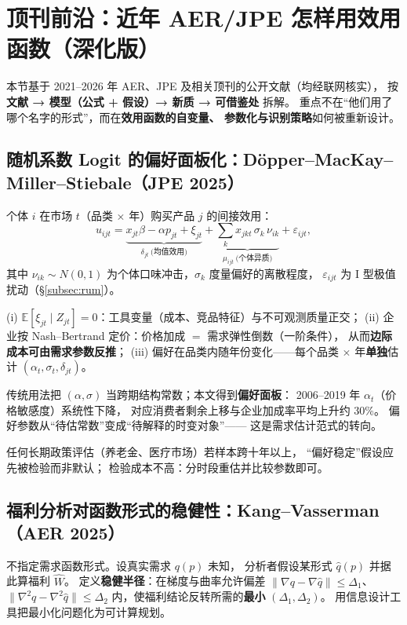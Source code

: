 \section{顶刊前沿：近年 AER/JPE 怎样用效用函数（深化版）}

本节基于 2021--2026 年 AER、JPE 及相关顶刊的公开文献（均经联网核实），
按 \textbf{文献 → 模型（公式 + 假设）→ 新质 → 可借鉴处} 拆解。
重点不在“他们用了哪个名字的形式”，而在\textbf{效用函数的自变量、
参数化与识别策略}如何被重新设计。

\subsection{随机系数 Logit 的偏好面板化：D\"opper--MacKay--Miller--Stiebale（JPE 2025）}\label{subsec:jpe-markups}

个体 $i$ 在市场 $t$（品类 $\times$ 年）购买产品 $j$ 的间接效用：
\[
u_{ijt}=\underbrace{x_{jt}\beta-\alpha p_{jt}+\xi_{jt}}_{\delta_{jt}\ \text{(均值效用)}}
+\underbrace{\sum_k x_{jkt}\,\sigma_k\,\nu_{ik}}_{\mu_{ijt}\ \text{(个体异质)}}
+\varepsilon_{ijt},
\]
其中 $\nu_{ik}\sim N(0,1)$ 为个体口味冲击，$\sigma_k$ 度量偏好的离散程度，
$\varepsilon_{ijt}$ 为 I 型极值扰动（§\ref{subsec:rum}）。

(i) $\mathbb{E}[\xi_{jt}\mid Z_{jt}]=0$：工具变量（成本、竞品特征）与不可观测质量正交；
(ii) 企业按 Nash--Bertrand 定价：价格加成 $=$ 需求弹性倒数（一阶条件），
从而\textbf{边际成本可由需求参数反推}；
(iii) 偏好在品类内随年份变化——每个品类 $\times$ 年\textbf{单独}估计
$(\alpha_t,\sigma_t,\delta_{jt})$。

传统用法把 $(\alpha,\sigma)$ 当跨期结构常数；本文得到\textbf{偏好面板}：
2006--2019 年 $\alpha_t$（价格敏感度）系统性下降，
对应消费者剩余上移与企业加成率平均上升约 30\%。
偏好参数从“待估常数”变成“待解释的时变对象”——
这是需求估计范式的转向。

任何长期政策评估（养老金、医疗市场）若样本跨十年以上，
“偏好稳定”假设应先被检验而非默认；
检验成本不高：分时段重估并比较参数即可。

\subsection{福利分析对函数形式的稳健性：Kang--Vasserman（AER 2025）}

不指定需求函数形式。设真实需求 $q(p)$ 未知，
分析者假设某形式 $\hat q(p)$ 并据此算福利 $\hat W$。
定义\textbf{稳健半径}：在梯度与曲率允许偏差
$\|\nabla q-\nabla\hat q\|\le\Delta_1$、$\|\nabla^2 q-\nabla^2\hat q\|\le\Delta_2$
内，使福利结论反转所需的\textbf{最小} $(\Delta_1,\Delta_2)$。
用信息设计工具把最小化问题化为可计算规划。

